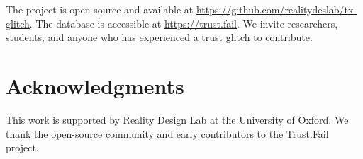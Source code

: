 \documentclass[11pt,a4paper]{article}
\begin{document}
The project is open-source and available at \url{https://github.com/realitydeslab/tx-glitch}. The database is accessible at \url{https://trust.fail}. We invite researchers, students, and anyone who has experienced a trust glitch to contribute.

\section*{Acknowledgments}

This work is supported by Reality Design Lab at the University of Oxford. We thank the open-source community and early contributors to the Trust.Fail project.



\end{document}
